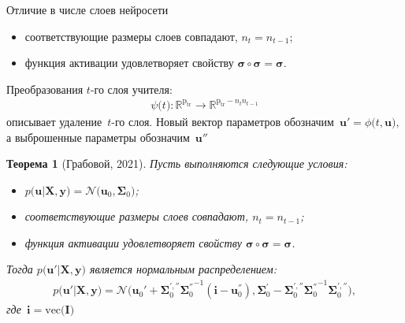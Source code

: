 \documentclass[10pt,pdf,hyperref={unicode}]{beamer}
\newtheorem{rustheorem}{Теорема}
\begin{document}
\begin{frame}{Отличие в числе слоев нейросети}
\begin{itemize}
    \item соответствующие размеры слоев совпадают, $n_t=n_{t-1}$;
    \item функция активации удовлетворяет свойству $\bm{\sigma} \circ \bm{\sigma} = \bm{\sigma}$.
\end{itemize}
Преобразования $t$-го слоя учителя:
\[
\begin{aligned}
\psi\bigr(t\bigr) : \mathbb{R}^{\text{p}_{\text{tr}}} \to \mathbb{R}^{\text{p}_{\text{tr}}-n_tn_{t-1}}
\end{aligned}
\]
описывает удаление~$t$-го слоя. Новый вектор параметров обозначим~$\mathbf{u}' =  \phi\bigr(t, \mathbf{u}\bigr),$ а выброшенные параметры обозначим~$\mathbf{u}''$

\begin{rustheorem}[Грабовой, 2021]
Пусть выполняются следующие условия:
\begin{itemize}
\item $p\bigr(\mathbf{u}|\mathbf{X}, \mathbf{y}\bigr) = \mathcal{N}\bigr(\mathbf{u}_0, \bm{\Sigma}_0\bigr)$;
\item соответствующие размеры слоев совпадают, $n_t=n_{t-1}$;
\item функция активации удовлетворяет свойству $\bm{\sigma} \circ \bm{\sigma} = \bm{\sigma}$.
\end{itemize}
Тогда $p\bigr(\mathbf{u}'|\mathbf{X}, \mathbf{y}\bigr)$ является нормальным распределением:
\[
\begin{aligned}
p\bigr(\mathbf{u}'|\mathbf{X}, \mathbf{y}\bigr) = \mathcal{N}\bigr(\mathbf{u}_{0}'+\bm{\Sigma}_0^{', ''}{\bm{\Sigma}_0^{''}}^{-1}\left(\mathbf{i} - \mathbf{u}_0^{''}\right), \bm{\Sigma}_0^{'}-\bm{\Sigma}_0^{', ''}{\bm{\Sigma}_0^{''}}^{-1}\bm{\Sigma}_0^{', ''}\bigr),
\end{aligned}
\]
где~$\mathbf{i} = \mathrm{vec}\bigr(\mathbf{I}\bigr)$
\end{rustheorem}

\end{frame}
\end{document}
